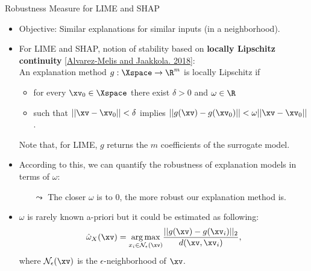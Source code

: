 \documentclass[11pt,compress,t,notes=noshow, aspectratio=169, xcolor=table]{beamer}
\begin{document}
\begin{vbframe}[c]{Robustness Measure for LIME and SHAP}  
	\begin{itemize}
		\item Objective: Similar explanations for similar inputs (in a neighborhood). 
		\item For LIME and SHAP, notion of stability based on \textbf{locally Lipschitz continuity} [\href{https://arxiv.org/abs/1806.08049}{Alvarez-Melis and Jaakkola. 2018}]:\\
		An explanation method $g:\Xspace \rightarrow \R^m$ is locally Lipschitz if 
		\begin{itemize}
		    \item for every $\xv_0 \in \Xspace$ there exist $\delta > 0$ and  $\omega \in \R$
		    \item such that $||\xv - \xv_0|| < \delta$ implies $||g(\xv) - g(\xv_0)|| < \omega ||\xv - \xv_0||$.
		\end{itemize}
		\footnotesize Note that, for LIME, $g$ returns the $m$ coefficients of the surrogate model. \normalsize
		\item According to this, we can quantify the robustness of explanation models in terms of $\omega$:
		\begin{itemize}
		    \item[$\leadsto$] The closer $\omega$ is to 0, the more robust our explanation method is. 
		\end{itemize}
		\item $\omega$ is rarely known a-priori but it could be estimated as following: 
		$$\hat{\omega}_{X}(\xv) = \underset{x_i \in \mathcal{N}_{\epsilon}(\xv)}{\arg \max} \frac{||g(\xv) - g(\xv_i)||_2}{d(\xv, \xv_i)},$$
		where $\mathcal{N}_{\epsilon}(\xv)$ is the $\epsilon$-neighborhood of $\xv$.
	\end{itemize}
\end{vbframe}

\end{document}
